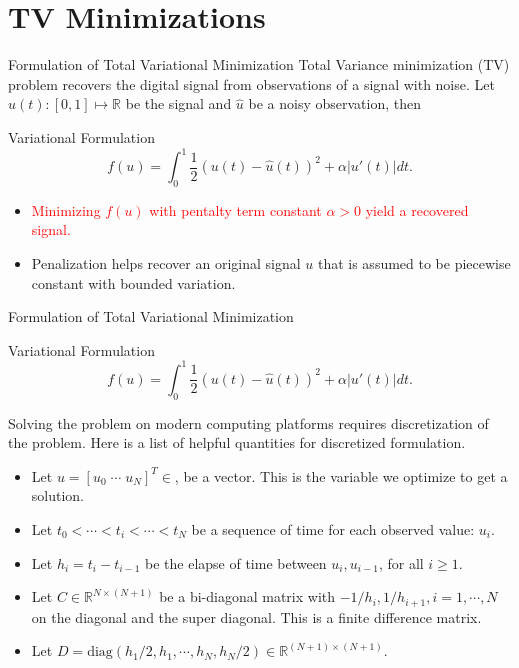 \documentclass[11pt]{beamer}
\theoremstyle{definition}
\begin{document}
\section{TV Minimizations}
    \begin{frame}{Formulation of Total Variational Minimization}
        Total Variance minimization (TV) problem recovers the digital signal from observations of a signal with noise. 
        Let $u(t):[0, 1]\mapsto \mathbb R$ be the signal and $\hat u$ be a noisy observation, then
        \begin{block}{Variational Formulation}
            \[
                f(u) = \int_0^1 \frac{1}{2} 
                (u(t) - \hat u(t))^2 + \alpha |u'(t)|dt. 
            \]    
        \end{block}
        \begin{itemize}
            \item \textcolor{red}{Minimizing $f(u)$ with pentalty term constant $\alpha > 0$ yield a recovered signal. }
            \item Penalization helps recover an original signal $u$ that is assumed to be piecewise constant with bounded variation. 
        \end{itemize}
    \end{frame}
    \begin{frame}{Formulation of Total Variational Minimization}
        \begin{block}{Variational Formulation}
            \[
                f(u) = \int_0^1 \frac{1}{2} 
                (u(t) - \hat u(t))^2 + \alpha |u'(t)|dt. 
            \]    
        \end{block}
        Solving the problem on modern computing platforms requires discretization of the problem. 
        Here is a list of helpful quantities for discretized formulation. 
        \begin{itemize}
            \item Let $u = [u_0\; \cdots \; u_{N}]^T \in $, be a vector. 
            This is the variable we optimize to get a solution. 
            \item Let $t_0< \cdots<  t_i <\cdots <t_N$ be a sequence of time for each observed value: $u_i$. 
            \item Let $h_i=t_{i} - t_{i - 1}$ be the elapse of time between $u_i, u_{i - 1}$, for all $i \ge 1$. 
            \item Let $C\in \mathbb R^{N\times (N + 1)}$ be a bi-diagonal matrix with $-1/h_{i}, 1/h_{i + 1}, i = 1,\cdots, N$ on the diagonal and the super diagonal. 
            This is a finite difference matrix. 
            \item Let $D= \text{diag}(h_1/2, h_1,\cdots, h_N, h_{N}/2) \in \mathbb R^{(N + 1)\times(N + 1)}$. 
        \end{itemize}
    \end{frame}
\end{document}
